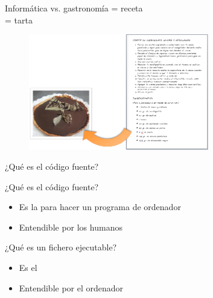 \documentclass{beamer}
\begin{document}
\begin{frame}
  \begin{exampleblock}{Informática vs. gastronomía}
    \centering 
     = receta \\  = tarta
  \end{exampleblock}

  \begin{figure}
    \centering
    \includegraphics[width=0.7\textwidth]{pics/receta.png}
  \end{figure}
  
\end{frame}


\begin{frame}{¿Qué es el código fuente?}

  \begin{block}{¿Qué es el código fuente?}
    \begin{itemize}
    \item Es la  para hacer un programa de ordenador
    \item Entendible por los humanos 
    \end{itemize}
  \end{block}

  \begin{block}{¿Qué es un fichero ejecutable?}
    \begin{itemize}
    \item Es el 
    \item Entendible por el ordenador
    \end{itemize}
  \end{block}
\end{frame}
\end{document}
